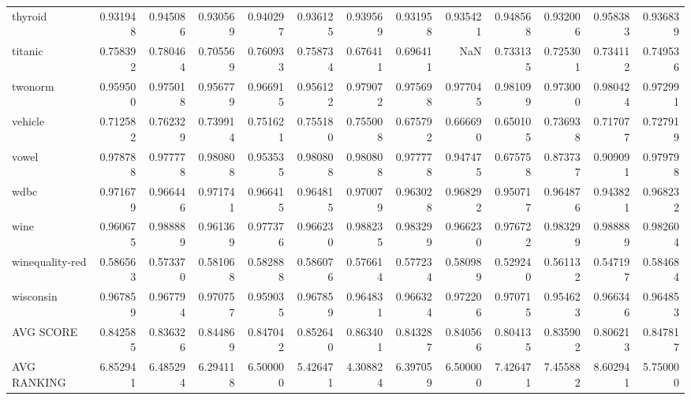 \begin{tabular}{lrrrrrrrrrrrr}
thyroid         &   0.931948 &  0.945086 &  0.930569 &  0.940297 &  0.936125 &  0.939569 &  0.931958 &  0.935421 &  0.948568 &  0.932006 &  0.958383 &  0.936839 \\
titanic         &   0.758392 &  0.780464 &  0.705569 &  0.760933 &  0.758734 &  0.676411 &  0.696411 &       NaN &  0.733135 &  0.725301 &  0.734112 &  0.749536 \\
twonorm         &   0.959500 &  0.975018 &  0.956779 &  0.966915 &  0.956122 &  0.979072 &  0.975698 &  0.977045 &  0.981099 &  0.973000 &  0.980424 &  0.972991 \\
vehicle         &   0.712582 &  0.762329 &  0.739914 &  0.751621 &  0.755180 &  0.755008 &  0.675792 &  0.666690 &  0.650105 &  0.736938 &  0.717077 &  0.727919 \\
vowel           &   0.978788 &  0.977778 &  0.980808 &  0.953535 &  0.980808 &  0.980808 &  0.977778 &  0.947475 &  0.675758 &  0.873737 &  0.909091 &  0.979798 \\
wdbc            &   0.971679 &  0.966446 &  0.971741 &  0.966415 &  0.964815 &  0.970079 &  0.963028 &  0.968292 &  0.950717 &  0.964876 &  0.943821 &  0.968232 \\
wine            &   0.960675 &  0.988889 &  0.961369 &  0.977376 &  0.966230 &  0.988235 &  0.983299 &  0.966230 &  0.976722 &  0.983299 &  0.988889 &  0.982604 \\
winequality-red &   0.586563 &  0.573370 &  0.581068 &  0.582888 &  0.586076 &  0.576614 &  0.577234 &  0.580989 &  0.529240 &  0.561132 &  0.547197 &  0.584684 \\
wisconsin       &   0.967859 &  0.967794 &  0.970757 &  0.959035 &  0.967859 &  0.964831 &  0.966324 &  0.972206 &  0.970715 &  0.954623 &  0.966346 &  0.964853 \\
AVG SCORE       &   0.842585 &  0.836326 &  0.844869 &  0.847042 &  0.852640 &  0.863401 &  0.843287 &  0.840566 &  0.804135 &  0.835902 &  0.806213 &  0.847817 \\
AVG RANKING     &   6.852941 &  6.485294 &  6.294118 &  6.500000 &  5.426471 &  4.308824 &  6.397059 &  6.500000 &  7.426471 &  7.455882 &  8.602941 &  5.750000 \\
\bottomrule
\end{tabular}
